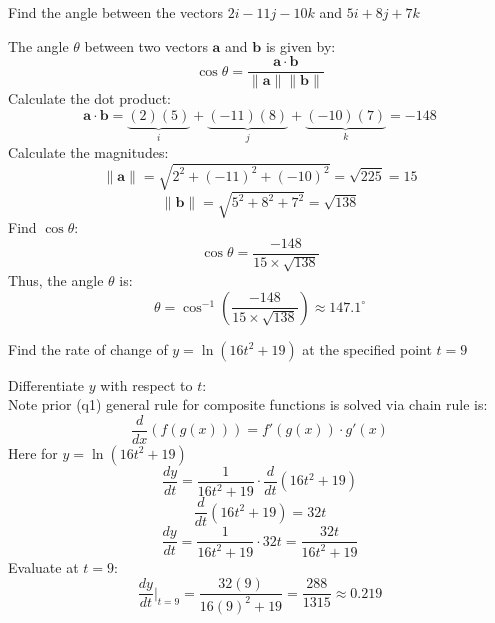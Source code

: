 \documentclass[a4paper, 12pt]{report}
\begin{document}
    \newpage
    \begin{tcolorbox}[title=\color{black}{\section{Q2}}, colback=white, colframe=black!30!white, boxrule=0.4mm, width=1\textwidth]
        Find the angle between the vectors \( 2 i-11 j-10 k \) and \( 5 i+8 j+7 k \)
    \end{tcolorbox}
    
    The angle \( \theta \) between two vectors \(\mathbf{a}\) and \(\mathbf{b}\) is given by:
    \[\cos \theta = \frac{\mathbf{a} \cdot \mathbf{b}}{\|\mathbf{a}\| \|\mathbf{b}\|}\]
    Calculate the dot product:
    \[\mathbf{a} \cdot \mathbf{b} = \underbrace{(2)(5)}_i + \underbrace{(-11)(8)}_j + \underbrace{(-10)(7)}_k = -148\]
    Calculate the magnitudes:
    \[\|\mathbf{a}\| = \sqrt{2^2 + (-11)^2 + (-10)^2} = \sqrt{225} = 15\]
    \[\|\mathbf{b}\| = \sqrt{5^2 + 8^2 + 7^2} = \sqrt{138}\]
    Find \(\cos \theta\):
    \[\cos \theta = \frac{-148}{15 \times \sqrt{138}}\]
    Thus, the angle \(\theta\) is:
    \[\boxed{\theta = \cos^{-1}\left(\frac{-148}{15 \times \sqrt{138}}\right) \approx 147.1^{\circ}}\]
    
    \newpage    
    \begin{tcolorbox}[title=\color{black}{\section{Q3}}, colback=white, colframe=black!30!white, boxrule=0.4mm, width=1\textwidth]
        Find the rate of change of \( y=\ln \left(16 t^{2}+19\right) \) at the specified point \( t=9 \)
    \end{tcolorbox}
        
    Differentiate \( y \) with respect to \( t \):\\[1em]
    Note prior (q1) general rule for composite functions is solved via chain rule is:
    \[\frac{d}{dx}(f(g(x))) = f'(g(x))\cdot g'(x)\]
    Here for $y=\ln \left(16 t^{2}+19\right)$
    \[\frac{dy}{dt} = \frac{1}{16t^2 + 19} \cdot \frac{d}{dt}(16t^2 + 19)\]
    \[\frac{d}{dt}(16t^2 + 19) = 32t\]
    \[\frac{dy}{dt} = \frac{1}{16t^2 + 19} \cdot 32t = \frac{32t}{16t^2 + 19}\]
    Evaluate at \( t = 9 \):
    \[\boxed{\frac{dy}{dt} \bigg|_{t=9} = \frac{32 (9)}{16(9)^2 + 19} = \frac{288}{1315} \approx 0.219}\]
    
\end{document}
